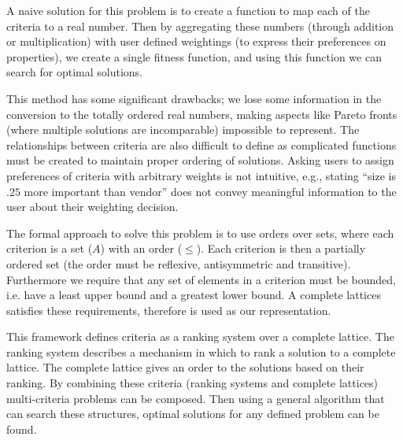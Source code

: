 A naive solution for this problem is to create a function to map each of the criteria to a real number.
Then by aggregating these numbers (through addition or multiplication) with user defined weightings 
(to express their preferences on properties), we create a single fitness function, 
and using this function we can search for optimal solutions.

This method has some significant drawbacks;
we lose some information in the conversion to the totally ordered real numbers,
making aspects like Pareto fronts \cite{pareto1964cours} (where multiple solutions are incomparable) impossible to represent.
The relationships between criteria are also difficult to define 
as complicated functions must be created to maintain proper ordering of solutions.
Asking users to assign preferences of criteria with arbitrary weights is not intuitive,
e.g., stating ``size is $.25$ more important than vendor'' does not convey meaningful information to the user about their weighting decision.

The formal approach to solve this problem is to use orders over sets, 
where each criterion is a set ($A$) with an order ($\leq$).
Each criterion is then a partially ordered set (the order must be reflexive, antisymmetric and transitive).
Furthermore we require that any set of elements in a criterion must be bounded, 
i.e. have a least upper bound and a greatest lower bound.
A complete lattices satisfies these requirements, therefore is used as our representation. 


This framework defines criteria as a ranking system over a complete lattice.
The ranking system describes a mechanism in which to rank a solution to a complete lattice. 
The complete lattice gives an order to the solutions based on their ranking.
By combining these criteria (ranking systems and complete lattices) multi-criteria problems can be composed.
Then using a general algorithm that can search these structures, 
optimal solutions for any defined problem can be found.


